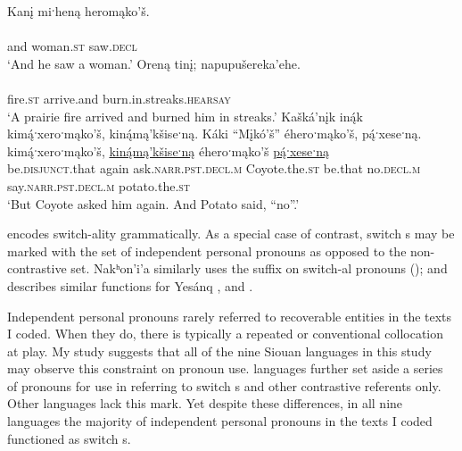 \documentclass[output=paper]{LSP/langsci}
\begin{document}
\ea\label{ruetaswitchtopic}
\ea\label{ruetanewtopic}
Kanį miˑheną heromąko’š.\rmfnm\\
\gll 	{}	 	 	\\
	and 			woman.\textsc{st} 	saw.\textsc{decl}\\
\glt	`And he saw a woman.'
\ex\label{ruetaatypicalsubject}
Oreną tinį; napupušereka’ehe.\rmfnm\\
\gll 	{}		\\
	fire.\textsc{st} 	arrive.and 	burn.in.streaks.\textsc{hearsay}\\
\glt	`A prairie fire arrived and burned him in streaks.'
\ex\label{birdcompetition}
Kašká’nįk in\'{ą}k kim\'{ą}ˑxeroˑmąko’š, kin\'{ą}mą’kšiseˑną. Káki “Mįkó’š” éheroˑmąko’š, p\'{ą}ˑxeseˑną.\rmfnm\\
\gll 	{}		 	kim\'{ą}ˑxeroˑmąko’š, 		\uline{kin\'{ą}mą’kšiseˑną}					éheroˑmąko’š 			\uline{p\'{ą}ˑxeseˑną}\\
	be.\textsc{disjunct}.that 	again 			ask.\textsc{narr.pst.decl.m} 	Coyote.the.\textsc{st}		be.that 		no.\textsc{decl.m} 					say.\textsc{narr.pst.decl.m} 	potato.the.\textsc{st}\\
\glt	`But Coyote asked him again. And Potato said, “no”.'
\z\z

	 encodes switch-ality grammatically. As a special case of contrast, switch s may be marked with the  set of independent personal pronouns as opposed to the non-contrastive  set. Nakʰon’i’a similarly uses the suffix  on switch-al pronouns (\citealt[129--130]{Cumberland2005}); and \citet[149]{Oliverio1996} describes similar functions for Yesánq ,  and . 
	
	Independent personal pronouns rarely referred to recoverable entities in the texts I coded. When they do, there is typically a repeated or conventional collocation at play. My study suggests that all of the nine Siouan languages in this study may observe this constraint on pronoun use.  languages further set aside a series of pronouns for use in referring to switch s and other contrastive referents only. Other languages lack this mark. Yet despite these differences, in all nine languages the majority of independent personal pronouns in the texts I coded functioned as switch s.
\end{document}
